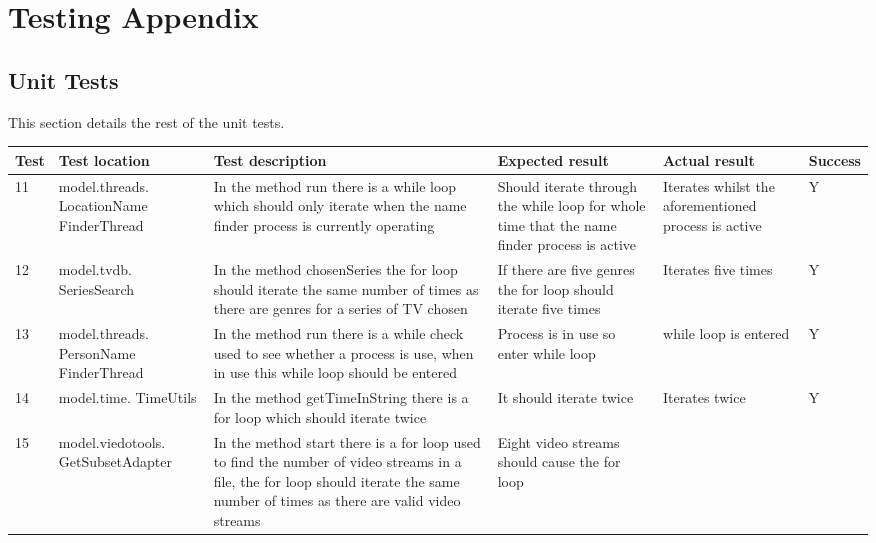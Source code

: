 \newpage
\section{Testing Appendix}
\label{sec:TestingAppendix}

\subsection{Unit Tests}
\label{sec:UnitTestAppendix}
This section details the rest of the unit tests.

\begin{center}
\begin{longtable}{| p{18pt} | p{90pt}| p{78pt}| p{75pt} | p{62pt} | p{35pt} |}
\hline
Test & Test location & Test description & Expected result & Actual result & Success\\\hline
11 & model.threads. \newline LocationName \newline FinderThread & In the method run there
is a while loop which should only iterate when the name finder process is currently
operating & Should iterate through the while loop for whole time that the name
finder process is active & Iterates whilst the aforementioned process is active
& Y\\ \hline
12 & model.tvdb. \newline SeriesSearch & In the method chosenSeries the for loop should iterate the same number of times 
as there are genres for a series of TV chosen & If there are five genres the for loop should iterate five times & Iterates five times & Y\\ \hline
13 & model.threads. \newline PersonName \newline FinderThread & In the method run there is a while check used to see whether a process is use, when in use this
while loop should be entered & Process is in use so enter while loop & while loop is entered & Y\\ \hline 
14 & model.time. \newline TimeUtils & In the method getTimeInString there is a for loop which should iterate twice & It should iterate 
twice & Iterates twice & Y\\ \hline
15 & model.viedotools. \newline GetSubsetAdapter & In the method start there is a for loop used to find the number of video streams in 
a file, the for loop should iterate the same number of times as there are valid video streams & Eight video streams should cause the for loop

\end{longtable}
\end{center}
